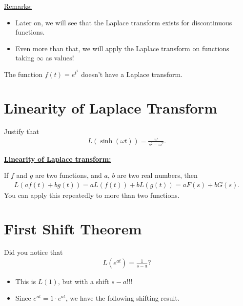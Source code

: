 \documentclass[12pt,a4paper]{article}
\newcounter{example}[section]
\begin{document}
	\vspace*{16pt}
	
	\underline{Remarks:}
		\begin{itemize}
		\item Later on, we will see that the Laplace transform exists for discontinuous functions.
		\item Even more than that, we will apply the Laplace transform on functions taking $\infty$ as values!
		\end{itemize}
		
	\vspace*{16pt}
	
	\begin{example}
	The function $f(t) = e^{t^2}$ doesn't have a Laplace transform.
	\end{example}
	
	\newpage

\section{Linearity of Laplace Transform}

\begin{example}
Justify that
	\begin{align*}
	L (\sinh (\omega t )) = \frac{\omega}{s^2 - \omega^2} .
	\end{align*}
\end{example}

\vfill

\underline{\textbf{Linearity of Laplace transform:}}

If $f$ and $g$ are two functions, and $a$, $b$ are two real numbers, then
	\begin{align*}
	L(af(t) + bg(t)) = aL(f(t)) + bL(g(t)) = a F(s) + b G(s) .
	\end{align*}
You can apply this repeatedly to more than two functions.

\newpage

\section{First Shift Theorem}

Did you notice that
	\begin{align*}
	L (e^{at}) = \frac{1}{s - a} ?
	\end{align*}

	\begin{itemize}
	\item This is $L(1)$, but with a shift $s - a$!!! 
	\item Since $e^{at} = 1 \cdot e^{at}$, we have the following shifting result.
	\end{itemize}
	\vspace*{18pt}
	
\end{document}
